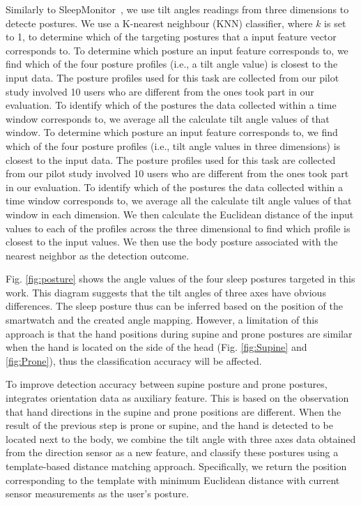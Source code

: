 Similarly to SleepMonitor~\cite{sleepmonitor}, we use tilt angles readings from three dimensions to detecte postures. We use a K-nearest
neighbour (KNN) classifier, where $k$ is set to 1,  to determine which of the targeting postures that a input feature vector corresponds
to. To determine which posture an input feature corresponds to, we find which of the four posture profiles (i.e., a tilt angle value) is
closest to the input data. The posture profiles used for this task are collected from our pilot study involved 10 users who are different
from the ones took part in our evaluation. To identify which of the postures the data collected within a time window corresponds to, we
average all the calculate tilt angle values of that window. To determine which posture an input feature corresponds to, we find which of
the four posture profiles (i.e., tilt angle values in three dimensions) is closest to the input data. The posture profiles used for this
task are collected from our pilot study involved 10 users who are different from the ones took part in our evaluation. To identify which of
the postures the data collected within a time window corresponds to, we average all the calculate tilt angle values of that window in each
dimension. We then calculate the Euclidean distance of the input values to each of the profiles across the three dimensional to find which
profile is closest to the input values. We then use the body posture associated with the nearest neighbor as the detection outcome.




Fig. \ref{fig:posture} shows the angle values of the four sleep postures targeted in this work. This diagram suggests that the tilt angles
of three axes have obvious differences. The sleep posture thus can be inferred based on the position of the smartwatch and the created
angle mapping. However, a limitation of this approach is that the hand positions during supine and prone postures are similar when the hand
is located on the side of the head (Fig. \ref{fig:Supine} and \ref{fig:Prone}), thus the classification accuracy will be affected.

To improve detection accuracy between supine posture and prone postures, \systemname integrates orientation data as auxiliary feature. This is based on the observation that hand directions in the supine and prone positions are different. When the result of the previous step is prone or supine, and the hand is detected to be located next to the body, we combine the tilt angle with three axes data obtained from the direction sensor as a new feature, and classify these postures using a template-based distance matching approach. Specifically, we return the position corresponding to the template with minimum Euclidean distance with current sensor measurements as the user's posture. %


